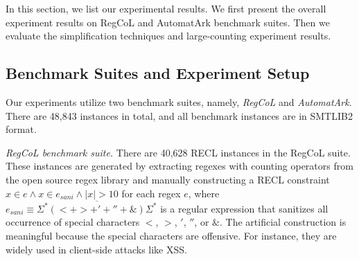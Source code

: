 %
In this section, we list our experimental results. We first present the overall experiment results on RegCoL and AutomatArk benchmark suites. Then we evaluate the simplification techniques and large-counting experiment results.


\vspace{-2mm}
\subsection{Benchmark Suites and Experiment Setup}\label{sec:bench}
\vspace{-1mm}

Our experiments utilize two benchmark suites, namely, \emph{RegCoL} and \emph{AutomatArk}. There are 48,843 instances in total, and all benchmark instances are in SMTLIB2 format.

\medskip
\noindent
\emph{RegCoL benchmark suite.} There are 40,628 RECL instances in the RegCoL suite. These instances are generated by extracting regexes with counting operators from the open source regex library \cite{regex_lingua_franca,redos_lenka} and manually constructing a RECL constraint $x \in e \wedge x \in e_{sani} \wedge |x| > 10$ for each regex $e$,
where $e_{sani} \equiv \overline{\Sigma^*(<+ >+'+''+\&)\Sigma^*}$ is a regular expression that sanitizes all occurrence of special characters $<$, $>$, $'$, $''$, or $\&$. The artificial construction is meaningful because the special characters are offensive. For instance, they are widely used in client-side attacks like XSS\cite{malware_detection_3_kudzu,CCH_18}.
\vspace{-0.1mm}

